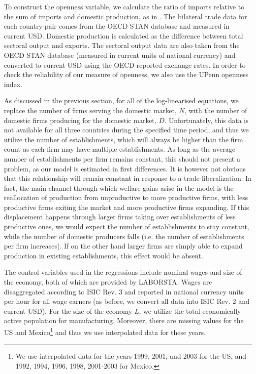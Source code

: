 To construct the openness variable, we calculate the ratio of imports relative to the sum of imports and domestic production, as in \citet{Chen2009}. The bilateral trade data for each country-pair comes from the OECD STAN database and measured in current USD. Domestic production is calculated as the difference between total sectoral output and exports. The sectoral output data are also taken from the OECD STAN database (measured in current units of national currency) and converted to current USD using the OECD-reported exchange rates. In order to check the reliability of our measure of openness, we also use the UPenn openness index. 

As discussed in the previous section, for all of the log-linearised equations, we replace the number of firms serving the domestic market, $N$, with the number of domestic firms producing for the domestic market, $D$. Unfortunately, this data is not available for all three countries during the specified time period, and thus we utilize the number of establishments, which will always be higher than the firm count as each firm may have multiple establishments. As long as the average number of establishments per firm remains constant, this should not present a problem, as our model is estimated in first differences. It is however not obvious that this relationship will remain constant in response to a trade liberalization. In fact, the main channel through which welfare gains arise in the model is the reallocation of production from unproductive to more productive firms, with less productive firms exiting the market and more productive firms expanding. If this displacement happens through larger firms taking over establishments of less productive ones, we would expect the number of establishments to stay constant, while the number of domestic producers falls (i.e. the number of establishments per firm increases). If on the other hand larger firms are simply able to expand production in existing establishments, this effect would be absent.  

The control variables used in the regressions include nominal wages and size of the economy, both of which are provided by LABORSTA. Wages are disaggregated according to ISIC Rev. 3 and reported in national currency units per hour for all wage earners (as before, we convert all data into ISIC Rev. 2 and current USD). For the size of the economy $L$, we utilize the total economically active population for manufacturing. Moreover, there are missing values for the US and Mexico\footnote{We use interpolated data for the years 1999, 2001, and 2003 for the US, and 1992, 1994, 1996, 1998, 2001-2003 for Mexico.} and thus we use interpolated data for these years.

